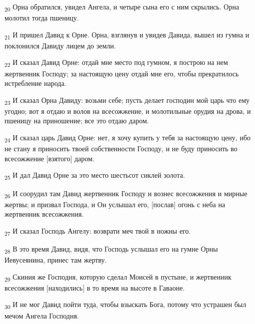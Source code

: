 \begin{tcolorbox}
\textsubscript{20} Орна обратился, увидел Ангела, и четыре сына его с ним скрылись. Орна молотил тогда пшеницу.
\end{tcolorbox}
\begin{tcolorbox}
\textsubscript{21} И пришел Давид к Орне. Орна, взглянув и увидев Давида, вышел из гумна и поклонился Давиду лицем до земли.
\end{tcolorbox}
\begin{tcolorbox}
\textsubscript{22} И сказал Давид Орне: отдай мне место под гумном, я построю на нем жертвенник Господу; за настоящую цену отдай мне его, чтобы прекратилось истребление народа.
\end{tcolorbox}
\begin{tcolorbox}
\textsubscript{23} И сказал Орна Давиду: возьми себе; пусть делает господин мой царь что ему угодно; вот я отдаю и волов на всесожжение, и молотильные орудия на дрова, и пшеницу на приношение; все это отдаю даром.
\end{tcolorbox}
\begin{tcolorbox}
\textsubscript{24} И сказал царь Давид Орне: нет, я хочу купить у тебя за настоящую цену, ибо не стану я приносить твоей собственности Господу, и не буду приносить во всесожжение [взятого] даром.
\end{tcolorbox}
\begin{tcolorbox}
\textsubscript{25} И дал Давид Орне за это место шестьсот сиклей золота.
\end{tcolorbox}
\begin{tcolorbox}
\textsubscript{26} И соорудил там Давид жертвенник Господу и вознес всесожжения и мирные жертвы; и призвал Господа, и Он услышал его, [послав] огонь с неба на жертвенник всесожжения.
\end{tcolorbox}
\begin{tcolorbox}
\textsubscript{27} И сказал Господь Ангелу: возврати меч твой в ножны его.
\end{tcolorbox}
\begin{tcolorbox}
\textsubscript{28} В это время Давид, видя, что Господь услышал его на гумне Орны Иевусеянина, принес там жертву.
\end{tcolorbox}
\begin{tcolorbox}
\textsubscript{29} Скиния же Господня, которую сделал Моисей в пустыне, и жертвенник всесожжения [находились] в то время на высоте в Гаваоне.
\end{tcolorbox}
\begin{tcolorbox}
\textsubscript{30} И не мог Давид пойти туда, чтобы взыскать Бога, потому что устрашен был мечом Ангела Господня.
\end{tcolorbox}
